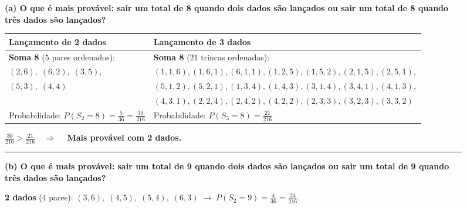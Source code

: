 \documentclass[11pt,a4paper]{article}
\theoremstyle{definition}
\theoremstyle{remark}
\begin{document}
\begin{figure}[H]
\centering
\begin{exambox}[title={Questão 4 da Prova de Matemática Discreta (DCC / ICEx / UFMG)}]
\small
\textbf{(a) O que é mais provável: sair um total de 8 quando dois dados são lançados ou sair um total de 8 quando três dados são lançados?}

\vspace{0.25em}
\renewcommand{\arraystretch}{1.18}
\begin{tabularx}{\textwidth}{@{}p{}|X@{}}
\textbf{Lançamento de 2 dados} & \textbf{Lançamento de 3 dados} \\
\hline
\textbf{Soma 8} ($5$ pares ordenados): &
\textbf{Soma 8} ($21$ trincas ordenadas): \\
$(2,6),\; (6,2),\; (3,5),$ &
$(1,1,6), (1,6,1), (6,1,1), (1,2,5), (1,5,2), (2,1,5), (2,5,1),$ \\
$(5,3),\; (4,4)$ &
$(5,1,2), (5,2,1), (1,3,4), (1,4,3), (3,1,4), (3,4,1), (4,1,3),$ \\
& $(4,3,1), (2,2,4), (2,4,2), (4,2,2), (2,3,3), (3,2,3), (3,3,2)$ \\[0.25em]
Probabilidade: $\displaystyle P(S_2 = 8) = \frac{5}{36} = \frac{30}{216}$ &
Probabilidade: $\displaystyle P(S_3 = 8) = \frac{21}{216}$
\end{tabularx}
\vspace{0.2em}
\begin{center}
$\displaystyle \boxed{\frac{30}{216}} > \frac{21}{216} \quad \Longrightarrow \quad$ \textbf{Mais provável com 2 dados.}
\end{center}

\hrule
\vspace{0.35em}
\textbf{(b) O que é mais provável: sair um total de 9 quando dois dados são lançados ou sair um total de 9 quando três dados são lançados?}

\vspace{0.2em}
\textbf{2 dados} ($4$ pares): $(3,6),\; (4,5),\; (5,4),\; (6,3) \;\longrightarrow\; \displaystyle P(S_2 = 9) = \frac{4}{36} = \frac{24}{216}$.


\end{exambox}
\end{figure}
\end{document}
